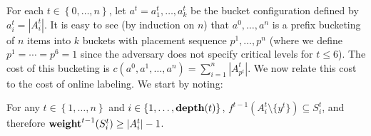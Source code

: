 \documentclass[unicode,review]{siamart1116}
\newcommand{\natInt}[2]{ \left\{ #1, \dotsc, #2 \right\} }
\newcommand{\pop}{{\rm {\bf pop}}}
\newcommand{\weight}{{\rm {\bf weight}}}
\newcommand{\depth}{{\rm {\bf depth}}}
\numberwithin{theorem}{section}
\begin{document}
For each $t \in \natInt{0}{n}$, let $a^t=a^t_1,\ldots,a^t_k$ be the bucket configuration defined
by $a^t_i=|A^t_i|$.  It is easy to see (by induction on $n$) that $a^0,\ldots,a^n$ is a prefix bucketing
of $n$ items into $k$ buckets with placement sequence $p^1,\ldots,p^n$ (where we define $p^1=\cdots = p^6 = 1$ since
the adversary does not specify critical levels for $t \leq 6$). 
The cost of this bucketing is $c(a^0,a^1,\dots,a^n)=\sum_{i=1}^n |A^t_{p^t}|$. 
We now relate this cost
to the cost of online labeling. We start by noting:

\begin{lemma}\label{l-p2}
For any $t \in \natInt{1}{n}$ and $i \in \natInt{1}{\depth(t)}$,  $f^{t-1}(A^t_i \setminus \{y^t\}) \subseteq S^t_i$,
and therefore $\weight^{t-1}(S^t_{i}) \ge |A^t_{i}| - 1$.
\end{lemma}

\iffalse
\begin{proof}
We prove this by induction on $t$.  For $t=1$ the result is trivial since  each of the sets $A^1_i \setminus \{y^t\}$ is
empty.

Assume $t>1$.    If $A^t_i\setminus \{y^t\}= \emptyset$  then the conclusion is trivial.  So assume
$A^t_i\setminus \{y^t\} \neq \emptyset$.  In particular, $i \leq p^t$.  We also claim that $i \leq p^{t-1}$.
If not then by definition $A^{t-1}_j = \emptyset$.  If $j< $
For $i=p^t$, by the definition of $p^t$ and  $A^t_{p^t}$ and the induction hypothesis we have:

$$
f^{t-1}(A^t_{p^t}\setminus \{y^t\}) = f^{t-2}(A^t_{p^t}\setminus \{y^t\}) =  \bigcup_{i \geq p^t}f^{t-2}( A^{t-1}_i) \subseteq \bigcup_{i \geq p^t} S^{t-1}_i = S^{t-1}_{p^t}=S^t_{p^t}.
$$

Finally consider the case $i<p^t$.  Then $A^t_i=A^{t-1}_i$.  If $i > p^{t-1}$ then this set is empty, and we're done.
So assume $i \leq p^{t-1}$.    
Recall from the definition of the adversary that $i \leq p^{t-1}$ implies $S^t_i=S^t_{i-1}$, and $i \leq p^t$ implies  
that  the busy segment $B^t$ is a subset of $S^t_i$,  which implies
that $\pop^t(S^t_i) =  \pop^{t-1}(S^t_i)\cup \{y^t\}$.  Let $i \in \natInt{1}{k}$.
If $i<p^t$ then by the definition of $A^t_i$ and the induction hypothesis
we have:
$$A^t_i = A^{t-1}_i \subseteq (f^{t-2})^{-1}(S^{t-1}_i) =  (f^{t-2})^{-1}(S^t_i) \subseteq (f^{t-1})^{-1}(S^t_i),$$
as required.


\end{proof}
\fi
\end{document}
